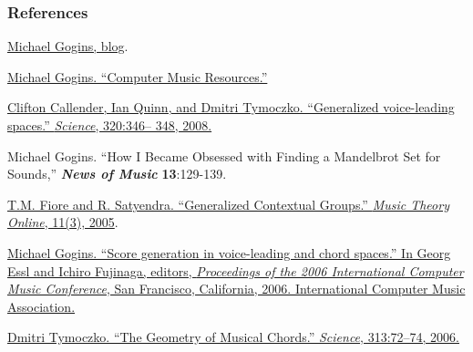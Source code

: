 \documentclass{beamer}
\begin{document}
        \begin{frame}[allowframebreaks]
            \frametitle<presentation>{References}
            
            \begin{thebibliography}{10}
                
                \beamertemplatebookbibitems
                
                 \href{http://michaelgogins.tumblr.com/}{Michael Gogins, blog}.
                
                 \href{https://github.com/gogins/gogins.github.io}{Michael
                    Gogins. ``Computer Music Resources.''}
                
                \href{http://www.sciencemag.org/content/320/5874/346.abstract}{Clifton
                    Callender, Ian Quinn, and Dmitri Tymoczko. ``Generalized voice-leading spaces.''
                    \emph{Science}, 320:346–
                    348, 2008.}
                
                 {Michael Gogins. ``How I Became Obsessed with Finding a
                    Mandelbrot Set for Sounds,'' \textbf{\textit{News of Music}}
                    \textbf{13}:129-139.}
                
                \href{http://www.mtosmt.org/issues/mto.05.11.3/mto.05.11.3.fiore_satyendra.pdf}{T.M.
                    Fiore and R. Satyendra. ``Generalized Contextual
                    Groups.'' \emph{Music Theory Online}, 11(3), 2005}.
                
                
                \href{https://www.dropbox.com/s/ztej71n2fbn4tq4/Lindenmayer_Systems_Based_on_Riemannian_Transformations.pdf}{Michael
                    Gogins. ``Score generation in voice-leading
                    and chord spaces.'' In Georg Essl and Ichiro Fujinaga,
                    editors, \emph{Proceedings of the 2006 International Computer Music Conference},
                    San Francisco, California,
                    2006. International Computer Music Association.}
                
                \href{http://www.sciencemag.org/content/313/5783/72.abstract?ijkey=wzKBea3ktKdu2&keytype=ref&siteid=sci}{Dmitri
                    Tymoczko. ``The Geometry of Musical Chords.'' \emph{Science}, 313:72–74, 2006.}
                
            \end{thebibliography}
            
        \end{frame}
        
    
\end{document}

